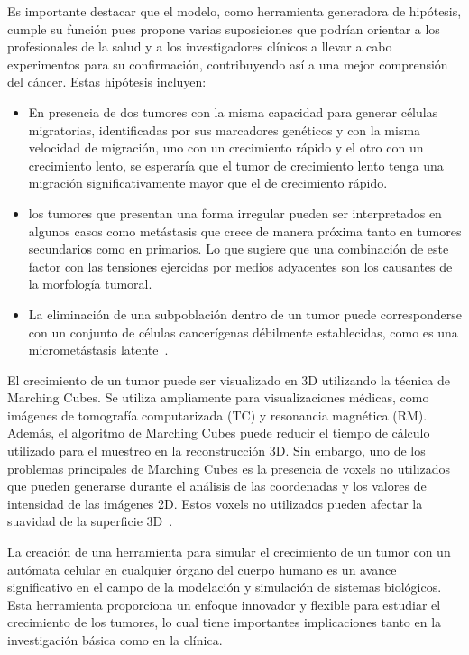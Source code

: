 \begin{conclusions}
Es importante destacar que el modelo, como herramienta generadora de hipótesis, cumple su función pues propone varias suposiciones que podrían orientar a los profesionales de la salud y a los investigadores clínicos a llevar a cabo experimentos para su confirmación, contribuyendo así a una mejor comprensión del cáncer. Estas hipótesis incluyen:

\begin{itemize}
    \item En presencia de dos tumores con la misma capacidad para generar células migratorias, identificadas por sus marcadores genéticos y con la misma velocidad de migración, uno con un crecimiento rápido y el otro con un crecimiento lento, se esperaría que el tumor de crecimiento lento tenga una migración significativamente mayor que el de crecimiento rápido.
    \item los tumores que presentan una forma irregular pueden ser interpretados en algunos casos como metástasis que crece de manera próxima tanto en tumores secundarios como en primarios. Lo que sugiere que una combinación de este factor con las tensiones ejercidas por medios adyacentes son los causantes de la morfología tumoral.
    \item La eliminación de una subpoblación dentro de un tumor puede corresponderse con un conjunto de células cancerígenas débilmente establecidas, como es una micrometástasis latente~\cite{robins}.
\end{itemize}

El crecimiento de un tumor puede ser visualizado en 3D utilizando la técnica de Marching Cubes. Se utiliza ampliamente para visualizaciones médicas, como imágenes de tomografía computarizada (TC) y resonancia magnética (RM). Además, el algoritmo de Marching Cubes puede reducir el tiempo de cálculo utilizado para el muestreo en la reconstrucción 3D. Sin embargo, uno de los problemas principales de Marching Cubes es la presencia de voxels no utilizados que pueden generarse durante el análisis de las coordenadas y los valores de intensidad de las imágenes 2D. Estos voxels no utilizados pueden afectar la suavidad de la superficie 3D~\cite{visutsak2020}.

La creación de una herramienta para simular el crecimiento de un tumor con un autómata celular en cualquier órgano del cuerpo humano es un avance significativo en el campo de la modelación y simulación de sistemas biológicos. Esta herramienta proporciona un enfoque innovador y flexible para estudiar el crecimiento de los tumores, lo cual tiene importantes implicaciones tanto en la investigación básica como en la clínica.


\end{conclusions}
